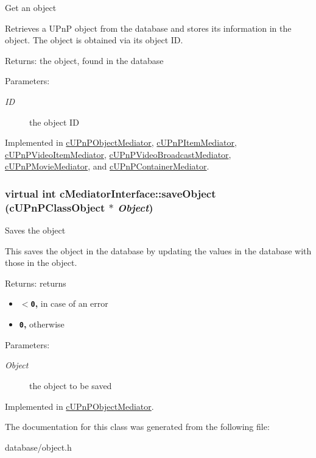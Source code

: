 Get an object

Retrieves a UPnP object from the database and stores its information in the object. The object is obtained via its object ID.

\begin{Desc}
\item[Returns:]the object, found in the database \end{Desc}
\begin{Desc}
\item[Parameters:]
\begin{description}
\item[{\em ID}]the object ID \end{description}
\end{Desc}


Implemented in \hyperlink{classcUPnPObjectMediator_5b4fff612476fb51690919f9c59899a5}{cUPnPObjectMediator}, \hyperlink{classcUPnPItemMediator_81411b2a472ade71d73a9c8ddc2a7990}{cUPnPItemMediator}, \hyperlink{classcUPnPVideoItemMediator_dd8927340a69d247965ef9250adefb21}{cUPnPVideoItemMediator}, \hyperlink{classcUPnPVideoBroadcastMediator_c13bf0f008f49b0ab499542391998a24}{cUPnPVideoBroadcastMediator}, \hyperlink{classcUPnPMovieMediator_d85b240eb54efd9ab46c440b51c71e83}{cUPnPMovieMediator}, and \hyperlink{classcUPnPContainerMediator_78b71f96fb4289dc78f897d6282078d6}{cUPnPContainerMediator}.\hypertarget{classcMediatorInterface_a2f40e697f499c64cfd007aa70e3da7e}{
\subsubsection[{saveObject}]{\setlength{\rightskip}{0pt plus 5cm}virtual int cMediatorInterface::saveObject ({\bf cUPnPClassObject} $\ast$ {\em Object})}}
\label{classcMediatorInterface_a2f40e697f499c64cfd007aa70e3da7e}


Saves the object

This saves the object in the database by updating the values in the database with those in the object.

\begin{Desc}
\item[Returns:]returns\begin{itemize}
\item {\bf {\tt $<$0},} in case of an error\item {\bf {\tt 0},} otherwise \end{itemize}
\end{Desc}
\begin{Desc}
\item[Parameters:]
\begin{description}
\item[{\em Object}]the object to be saved \end{description}
\end{Desc}


Implemented in \hyperlink{classcUPnPObjectMediator_c200f88239b8940d9d38cbe04c3e961e}{cUPnPObjectMediator}.

The documentation for this class was generated from the following file:\begin{CompactItemize}
\item 
database/object.h\end{CompactItemize}
